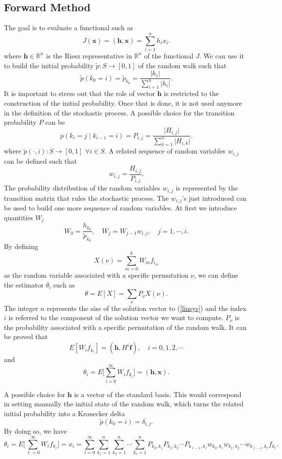 \documentclass[a4paper,10pt]{article}
\begin{document}
\subsection{Forward Method}
The goal is to evaluate a functional such as 
\[
J(\mathbf{x})=(\mathbf{h},\mathbf{x})=\sum_{i=1}^n h_i x_i.
\]
where $\mathbf{h}\in \mathbb{R}^n$ is the Riesz representative in 
$\mathbb{R}^n$ of the functional $J$.
We can use it to build the initial probability $\tilde{p}: 
S\rightarrow [0,1]$ of the random walk such that
\[
\tilde{p}(k_0=i)=\tilde{p}_{k_0}=\frac{\lvert h_i\rvert}{\sum_{i=1}^n \lvert 
h_i\rvert}.
\]
It is important to stress out that the role of vector $\mathbf{h}$ is 
restricted to the construction of the initial probability. Once that is done, 
it is 
not used anymore in the definition of the stochastic process. 
A possible choice for the transition probability $P$ can be
\[
p(k_i=j \;\lvert\;k_{i-1}=i )=P_{i,j}=\frac{\lvert H_{i,j}\rvert}{\sum_{k=1}^n 
\lvert H_{i,k}\rvert}.
\]
where $\tilde{p}(\cdot,i):S\rightarrow [0,1]$ $\forall i\in S$.
A related sequence of random variables $w_{i,j}$ can be defined 
such that 
\[
w_{i,j}=\frac{H_{i,j}}{P_{i,j}}.
\]
The probability distribution of the random variables $w_{i,j}$ is represented 
by the transition matrix that rules the stochastic process. The $w_{i,j}$'s 
just introduced can be used to build one more sequence 
of random variables. 
At first we introduce quantities $W_j$ 
\[
W_{0}=\frac{h_{k_0}}{\tilde{p}_{k_0}}, \quad W_j=W_{j-1} w_{i,j}, \quad 
j=1,\cdots, i.
\]
By defining 
\[
X(\nu)=\sum_{m=0}^k W_m f_{i_m}
\]
as the random variable associated with a specific permutation $\nu$, we can 
define the estimator $\theta_i$ such as
\[
\theta=E[X]=\sum_{\nu}P_{\nu}X(\nu).
\]
The integer $n$ represents the size of the solution vector to (\ref{linsys}) 
and 
the
index 
$i$ 
is referred to the component of the solution vector we want to compute. 
$P_{\nu}$ is the probability associated with a specific permutation of the 
random walk.  
It can be proved that 
\[
E[W_i f_{k_i}]=(\mathbf{h},H^i\mathbf{f}), \quad i=0,1,2,\cdots
\]
and 
\[
\theta_i=E\bigg[\sum_{i=0}^\infty W_i f_{k_i}\bigg]=(\mathbf{h},\mathbf{x}).
\]

A possible choice for $\mathbf{h}$ is a vector of the standard basis. This 
would correspond in setting manually the initial state of the random walk, 
which turns the related initial probability into a Kronecker delta
\[
\tilde{p}(k_0=i)=\delta_{i,j}.
\]
By doing so, we have 
\begin{equation}
\theta_i=E\bigg[\sum_{\ell=0}^\infty W_{\ell} 
f_{k_{\ell}}\bigg]=x_i=\sum_{l=0}^\infty 
\sum_{k_1=1}^{n}\sum_{k_2=1}^n\cdots \sum_{k_{\ell}=1}^n 
P_{k_0,k_1}P_{k_1,k_2}\cdots P_{k_{\ell-1}, 
k_{\ell}}w_{k_0,k_1}w_{k_1,k_2}\cdots 
w_{k_{\ell-1}, k_{\ell}}f_{k_{\ell}}.
\label{dir_mean}
\end{equation}
\end{document}
